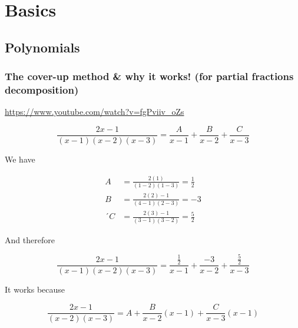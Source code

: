 \chapter{Basics}
\section{Polynomials}
\subsection*{The cover-up method \& why it works! (for partial fractions decomposition)}
\url{https://www.youtube.com/watch?v=fgPviiv_oZs}

\begin{equation}
  \frac{2x-1}{(x-1)(x-2)(x-3)}=\frac{A}{x-1}+\frac{B}{x-2}+\frac{C}{x-3}
\end{equation}

We have

\begin{equation}
  \begin{aligned}
    A &= \frac{2(1)}{(1-2)(1-3)}   = \frac{1}{2} \\
    B &= \frac{2(2)-1}{(4-1)(2-3)} = -3 \\´
    C &= \frac{2(3)-1}{(3-1)(3-2)} = \frac{5}{2}
  \end{aligned}
\end{equation}

And therefore

\begin{equation}
  \frac{2x-1}{(x-1)(x-2)(x-3)}=\frac{\frac{1}{2}}{x-1}+\frac{-3}{x-2}+\frac{\frac{5}{2}}{x-3}
\end{equation}

It works because

\begin{equation}
  \frac{2x-1}{(x-2)(x-3)}=A+\frac{B}{x-2}(x-1)+\frac{C}{x-3}(x-1)
\end{equation}